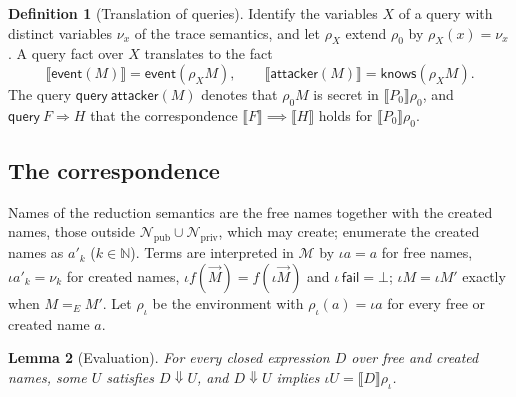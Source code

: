 \documentclass[11pt]{article}
\theoremstyle{definition}
\newtheorem{definition}{Definition}[section]
\theoremstyle{plain}
\newtheorem{lemma}[definition]{Lemma}
\theoremstyle{remark}
\newcommand{\N}{\mathbb{N}}
\newcommand{\sem}[1]{\llbracket #1 \rrbracket}
\newcommand{\red}[1]{\text{(Red #1)}}
\begin{document}
\begin{definition}[Translation of queries]
Identify the variables $X$ of a query with distinct variables $\nu_x$ of the trace semantics, and let $\rho_X$ extend $\rho_0$ by $\rho_X(x)=\nu_x$. A query fact over $X$ translates to the fact
\[
\sem{\mathsf{event}(M)}=\mathsf{event}(\rho_XM),\qquad\sem{\mathsf{attacker}(M)}=\mathsf{knows}(\rho_XM).
\]
The query $\mathsf{query}\ \mathsf{attacker}(M)$ denotes that $\rho_0M$ is secret in $\sem{P_0}\rho_0$, and $\mathsf{query}\ F\Longrightarrow H$ that the correspondence $\sem{F}\implies\sem{H}$ holds for $\sem{P_0}\rho_0$.
\end{definition}

\subsection{The correspondence}

Names of the reduction semantics are the free names together with the created names, those outside $\mathcal{N}_{\mathrm{pub}}\cup\mathcal{N}_{\mathrm{priv}}$, which \red{Res} may create; enumerate the created names as $a'_k$ ($k\in\N$). Terms are interpreted in $\mathcal{M}$ by $\iota a=a$ for free names, $\iota a'_k=\nu_k$ for created names, $\iota f(\vec M)=f(\iota\vec M)$ and $\iota\,\mathsf{fail}=\bot$; $\iota M=\iota M'$ exactly when $M=_E M'$. Let $\rho_\iota$ be the environment with $\rho_\iota(a)=\iota a$ for every free or created name $a$.

\begin{lemma}[Evaluation]\label{lem:eval}
For every closed expression $D$ over free and created names, some $U$ satisfies $D\Downarrow U$, and $D\Downarrow U$ implies $\iota U=\sem{D}\rho_\iota$.
\end{lemma}
\end{document}
